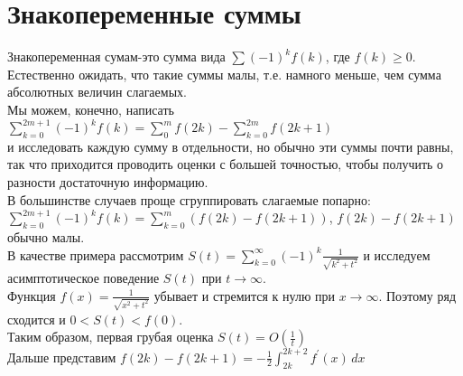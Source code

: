 \documentclass{report}
\begin{document}
\section{Знакопеременные суммы}
Знакопеременная сумам-это сумма вида $\sum(-1)^{k}f(k)$, где $f(k)\geq{0}$. Естественно ожидать, что такие суммы малы, т.е. намного меньше, чем сумма абсолютных величин слагаемых. \\
Мы можем, конечно, написать \\
$\sum_{k=0}^{2m+1}(-1)^{k}f(k)=\sum_{0}^{m}f(2k)-\sum_{k=0}^{2m}f(2k+1)$ \\
и исследовать каждую сумму в отдельности, но обычно эти суммы почти равны, так что приходится проводить оценки с большей точностью, чтобы получить о разности достаточную информацию. \\
В большинстве случаев проще сгруппировать слагаемые попарно: \\
$\sum_{k=0}^{2m+1}(-1)^{k}f(k)=\sum_{k=0}^{m}(f(2k)-f(2k+1))$, $f(2k)-f(2k+1)$ обычно малы. \\
В качестве примера рассмотрим $S(t)=\sum_{k=0}^{\infty}(-1)^{k}\frac{1}{\sqrt{k^2+t^2}}$ и исследуем асимптотическое поведение $S(t)$ при $t\to\infty$. \\
Функция $f(x)=\frac{1}{\sqrt{x^2+t^2}}$ убывает и стремится к нулю при $x\to\infty$. Поэтому ряд сходится и $0<S(t)<f(0)$. \\
Таким образом, первая грубая оценка $S(t)=O\left(\frac{1}{t}\right)$ \\
Дальше представим $f(2k)-f(2k+1)=-\frac{1}{2}\int_{2k}^{2k+2}f^\prime(x)\,dx$
\end{document}
